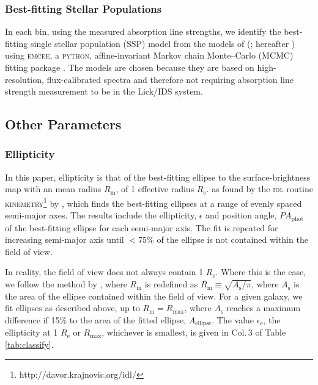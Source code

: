 \documentclass[a4paper,fleqn,usenatbib]{mnras}
\begin{document}
	\subsubsection{Best-fitting Stellar Populations}
		\label{subsubsec:stellarPop}
		In each bin, using the measured absorption line strengths, we identify the best-fitting single stellar population (SSP) model from the models of \citeauthor{Thomas2010} (\citeyear{Thomas2010}; hereafter ) using \textsc{emcee}, a \textsc{python}, affine-invariant Markov chain Monte--Carlo (MCMC) fitting package \citep{Foreman-Mackey2013}. The  models are chosen because they are based on high-resolution, flux-calibrated spectra and therefore not requiring absorption line strength measurement to be in the Lick/IDS system.

	\subsection{Other Parameters}
		\subsubsection{Ellipticity}
			\label{subsubsec:ellip}
			In this paper, ellipticity is that of the best-fitting ellipse to the surface-brightness map with an mean radius $R_\text{m}$, of 1 effective radius $R_\text{e}$. %
			as found by the \textsc{idl} routine \textsc{kinemetry}\footnote{http://davor.krajnovic.org/idl/} by \citet{Krajnovic2006}, which finds the best-fitting ellipses at a range of evenly spaced semi-major axes. %
			The results include the ellipticity, $\epsilon$ and position angle, $PA_\text{phot}$ of the best-fitting ellipse for each semi-major axis. The fit is repeated for increasing semi-major axis until $<$75\% of the ellipse is not contained within the field of view.

			In reality, the field of view does not always contain 1 $R_\text{e}$. Where this is the case, we follow the method by \citet{Emsellem2007}, where $R_\text{m}$ is redefined as $R_\text{m} \equiv \sqrt{A_\text{s}/\pi}$, where $A_\text{s}$ is the area of the ellipse contained within the field of view. For a given galaxy, we fit ellipses as described above, up to $R_\text{m} = R_\text{max}$, where $A_\text{s}$ reaches a maximum difference if 15\% to the area of the fitted ellipse, $A_\text{ellipse}$. The value $\epsilon_\text{e}$, the ellipticity at 1 $R_\text{e}$ or $R_\text{max}$, whichever is smallest, is given in Col.\,3 of Table \ref{tab:classify}. 
\end{document}
